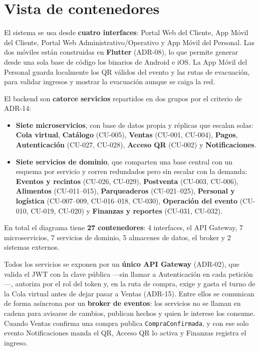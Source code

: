 \section{Vista de contenedores}
\label{sec:contenedores}

El sistema se usa desde \textbf{cuatro interfaces}: Portal Web del Cliente, App Móvil del Cliente,
Portal Web Administrativo/Operativo y App Móvil del Personal. Las dos móviles están construidas en
\textbf{Flutter} (ADR-08), lo que permite generar desde una sola base de código los binarios de
Android e iOS. La App Móvil del Personal guarda localmente los QR válidos del evento y las rutas de
evacuación, para validar ingresos y mostrar la evacuación aunque se caiga la red.

El backend son \textbf{catorce servicios} repartidos en dos grupos por el criterio de ADR-14:

\begin{itemize}
\item \textbf{Siete microservicios}, con base de datos propia y réplicas que escalan solas:
      \textbf{Cola virtual}, \textbf{Catálogo} (CU-005), \textbf{Ventas} (CU-001, CU-004),
      \textbf{Pagos}, \textbf{Autenticación} (CU-027, CU-028), \textbf{Acceso QR} (CU-002) y
      \textbf{Notificaciones}.
\item \textbf{Siete servicios de dominio}, que comparten una base central con un esquema por
      servicio y corren redundados pero sin escalar con la demanda: \textbf{Eventos y recintos}
      (CU-026, CU-029), \textbf{Postventa} (CU-003, CU-006), \textbf{Alimentos} (CU-011--015),
      \textbf{Parqueaderos} (CU-021--025), \textbf{Personal y logística} (CU-007--009, CU-016--018,
      CU-030), \textbf{Operación del evento} (CU-010, CU-019, CU-020) y \textbf{Finanzas y
      reportes} (CU-031, CU-032).
\end{itemize}

En total el diagrama tiene \textbf{27 contenedores}: 4 interfaces, el API Gateway, 7 microservicios,
7 servicios de dominio, 5 almacenes de datos, el broker y 2 sistemas externos.

Todos los servicios se exponen por un \textbf{único API Gateway} (ADR-02), que valida el JWT con la
clave pública ---sin llamar a Autenticación en cada petición---, autoriza por el rol del token y, en
la ruta de compra, exige y gasta el turno de la Cola virtual antes de dejar pasar a Ventas
(ADR-15). Entre ellos se comunican de forma asíncrona por un \textbf{broker de eventos}: los
servicios no se llaman en cadena para avisarse de cambios, publican hechos y quien le interese los
consume. Cuando Ventas confirma una compra publica \texttt{Compra\-Confirmada}, y con ese solo
evento Notificaciones manda el QR, Acceso QR lo activa y Finanzas registra el ingreso.

